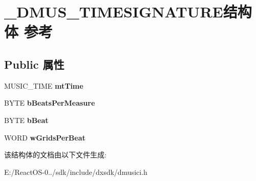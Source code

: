 \hypertarget{struct___d_m_u_s___t_i_m_e_s_i_g_n_a_t_u_r_e}{}\section{\+\_\+\+D\+M\+U\+S\+\_\+\+T\+I\+M\+E\+S\+I\+G\+N\+A\+T\+U\+R\+E结构体 参考}
\label{struct___d_m_u_s___t_i_m_e_s_i_g_n_a_t_u_r_e}
\subsection*{Public 属性}
\begin{DoxyCompactItemize}
\item 
\mbox{\label{struct___d_m_u_s___t_i_m_e_s_i_g_n_a_t_u_r_e_a19242ae6cce48774a4d038802e50f1ee}} 
M\+U\+S\+I\+C\+\_\+\+T\+I\+ME {\bfseries mt\+Time}
\item 
\mbox{\label{struct___d_m_u_s___t_i_m_e_s_i_g_n_a_t_u_r_e_a445dee0a0026cf3bd5a37aa2efb3c3d2}} 
B\+Y\+TE {\bfseries b\+Beats\+Per\+Measure}
\item 
\mbox{\label{struct___d_m_u_s___t_i_m_e_s_i_g_n_a_t_u_r_e_ae7f1eca4478c5a740e72e37cff5e99fc}} 
B\+Y\+TE {\bfseries b\+Beat}
\item 
\mbox{\label{struct___d_m_u_s___t_i_m_e_s_i_g_n_a_t_u_r_e_a14c3bdc147293ec7d9f0e4a9cfda8915}} 
W\+O\+RD {\bfseries w\+Grids\+Per\+Beat}
\end{DoxyCompactItemize}


该结构体的文档由以下文件生成\+:\begin{DoxyCompactItemize}
\item 
E\+:/\+React\+O\+S-\/0../sdk/include/dxsdk/dmusici.\+h\end{DoxyCompactItemize}
